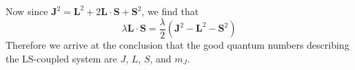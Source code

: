 Now since $\mathbf{J}^2 = \mathbf{L}^2 + 2\mathbf{L} \cdot \mathbf{S} + \mathbf{S}^2$, we find that
\begin{equation}
\lambda \mathbf{L} \cdot \mathbf{S} = \frac{\lambda}{2}(\mathbf{J}^2-\mathbf{L}^2-\mathbf{S}^2 )
\end{equation}
Therefore we arrive at the conclusion that the good quantum numbers describing the LS-coupled system are $J$, $L$, $S$, and $m_J$.




 
\nocite{ashcroftmermin,blundell_book}


